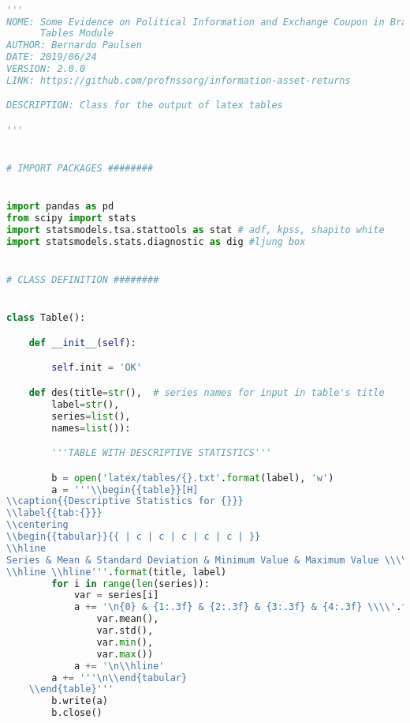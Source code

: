 \begin{lstlisting}[language=Python]

'''
NOME: Some Evidence on Political Information and Exchange Coupon in Brazil -
      Tables Module
AUTHOR: Bernardo Paulsen
DATE: 2019/06/24
VERSION: 2.0.0
LINK: https://github.com/profnssorg/information-asset-returns

DESCRIPTION: Class for the output of latex tables

'''


# IMPORT PACKAGES ########


import pandas as pd
from scipy import stats
import statsmodels.tsa.stattools as stat # adf, kpss, shapito white
import statsmodels.stats.diagnostic as dig #ljung box


# CLASS DEFINITION ########


class Table():

    def __init__(self):

        self.init = 'OK'

    def des(title=str(),  # series names for input in table's title
        label=str(),
        series=list(),
        names=list()):

        '''TABLE WITH DESCRIPTIVE STATISTICS'''

        b = open('latex/tables/{}.txt'.format(label), 'w')
        a = '''\\begin{{table}}[H]
\\caption{{Descriptive Statistics for {}}}
\\label{{tab:{}}}
\\centering
\\begin{{tabular}}{{ | c | c | c | c | c | }}
\\hline
Series & Mean & Standard Deviation & Minimum Value & Maximum Value \\\\
\\hline \\hline'''.format(title, label)
        for i in range(len(series)):
            var = series[i]
            a += '\n{0} & {1:.3f} & {2:.3f} & {3:.3f} & {4:.3f} \\\\'.format(names[i],
                var.mean(),
                var.std(),
                var.min(),
                var.max())
            a += '\n\\hline'
        a += '''\n\\end{tabular}
    \\end{table}'''
        b.write(a)
        b.close()


\end{lstlisting}
